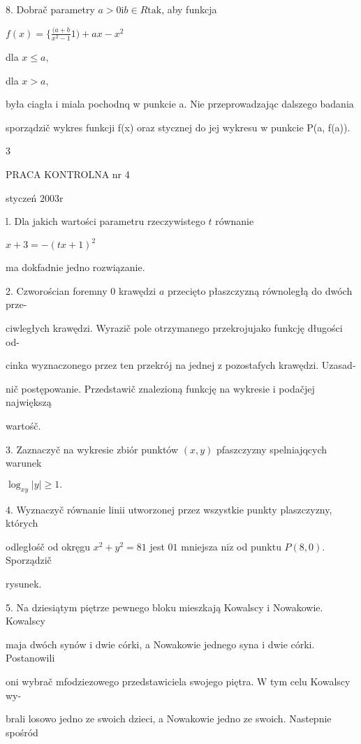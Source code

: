 \documentclass[a4paper,12pt]{article}
\begin{document}
8. Dobrač parametry $a>0\mathrm{i}b\in R\mathrm{t}\mathrm{a}\mathrm{k}$, aby funkcja

$f(x)=\displaystyle \{\frac{(a+b}{x^{2}-1}1)+ax-x^{2}$

dla $x\leq a,$

dla $x>a,$

była ciagła i miala pochodnq w punkcie a. Nie przeprowadzając dalszego badania

sporządzič wykres funkcji f(x) oraz stycznej do jej wykresu w punkcie P(a, f(a)).

3





PRACA KONTROLNA nr 4

styczeń $2003\mathrm{r}$

l. Dla jakich wartości parametru rzeczywistego $t$ równanie

$x+3=-(tx+1)^{2}$

ma dokfadnie jedno rozwiązanie.

2. Czworościan foremny $0$ krawędzi $a$ przecięto płaszczyzną równoległą do dwóch prze-

ciwległych krawędzi. Wyrazič pole otrzymanego przekrojujako funkcję długości od-

cinka wyznaczonego przez ten przekrój na jednej $\mathrm{z}$ pozostafych krawędzi. Uzasad-

nič postępowanie. Przedstawič znalezioną funkcję na wykresie $\mathrm{i}$ podačjej największą

wartośč.

3. Zaznaczyč na wykresie zbiór punktów $(x,y)$ pfaszczyzny spelniajqcych warunek

$\log_{xy}|y|\geq 1.$

4. Wyznaczyč równanie linii utworzonej przez wszystkie punkty plaszczyzny, których

odległośč od okręgu $x^{2}+y^{2}=81$ jest $01$ mniejsza $\mathrm{n}\mathrm{i}\dot{\mathrm{z}}$ od punktu $P(8,0)$. Sporządzič

rysunek.

5. Na dziesiątym piętrze pewnego bloku mieszkają Kowalscy $\mathrm{i}$ Nowakowie. Kowalscy

maja dwóch synów $\mathrm{i}$ dwie córki, a Nowakowie jednego syna $\mathrm{i}$ dwie córki. Postanowili

oni wybrač mfodziezowego przedstawiciela swojego piętra. $\mathrm{W}$ tym celu Kowalscy wy-

brali losowo jedno ze swoich dzieci, a Nowakowie jedno ze swoich. Nastepnie spośród
\end{document}
